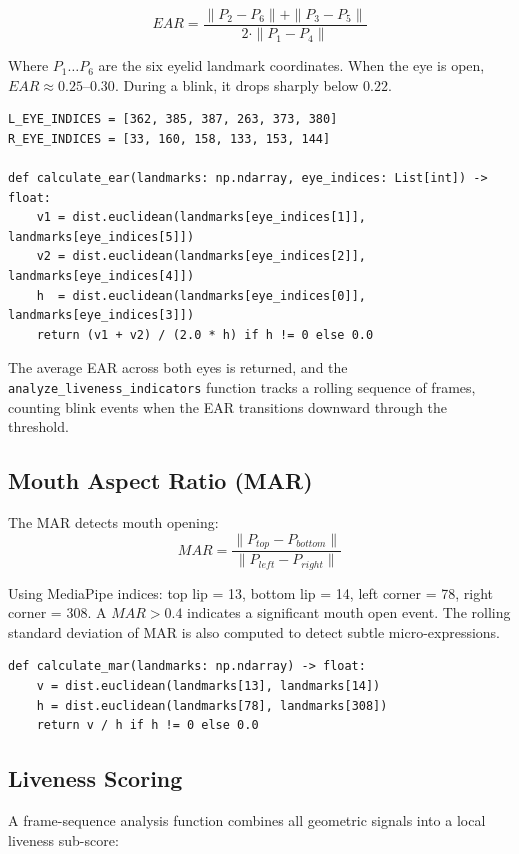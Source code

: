 \documentclass[12pt,a4paper]{report}
\begin{document}
\[
EAR = \frac{\| P_2 - P_6 \| + \| P_3 - P_5 \|}{2 \cdot \| P_1 - P_4 \|}
\]

Where $P_1 \ldots P_6$ are the six eyelid landmark coordinates. When the eye is open, $EAR \approx 0.25$--$0.30$. During a blink, it drops sharply below $0.22$.

\begin{lstlisting}[style=pythonstyle, caption={EAR Computation --- Facial\_Landmarks\_Modality.py}]
L_EYE_INDICES = [362, 385, 387, 263, 373, 380]
R_EYE_INDICES = [33, 160, 158, 133, 153, 144]

def calculate_ear(landmarks: np.ndarray, eye_indices: List[int]) -> float:
    v1 = dist.euclidean(landmarks[eye_indices[1]], landmarks[eye_indices[5]])
    v2 = dist.euclidean(landmarks[eye_indices[2]], landmarks[eye_indices[4]])
    h  = dist.euclidean(landmarks[eye_indices[0]], landmarks[eye_indices[3]])
    return (v1 + v2) / (2.0 * h) if h != 0 else 0.0
\end{lstlisting}

The average EAR across both eyes is returned, and the \texttt{analyze\_liveness\_indicators} function tracks a rolling sequence of frames, counting blink events when the EAR transitions downward through the threshold.

\subsection{Mouth Aspect Ratio (MAR)}
The MAR detects mouth opening:
\[
MAR = \frac{\| P_{top} - P_{bottom} \|}{\| P_{left} - P_{right} \|}
\]

Using MediaPipe indices: top lip = 13, bottom lip = 14, left corner = 78, right corner = 308. A $MAR > 0.4$ indicates a significant mouth open event. The rolling standard deviation of MAR is also computed to detect subtle micro-expressions.

\begin{lstlisting}[style=pythonstyle, caption={MAR Computation}]
def calculate_mar(landmarks: np.ndarray) -> float:
    v = dist.euclidean(landmarks[13], landmarks[14])
    h = dist.euclidean(landmarks[78], landmarks[308])
    return v / h if h != 0 else 0.0
\end{lstlisting}

\subsection{Liveness Scoring}
A frame-sequence analysis function combines all geometric signals into a local liveness sub-score:
\end{document}
